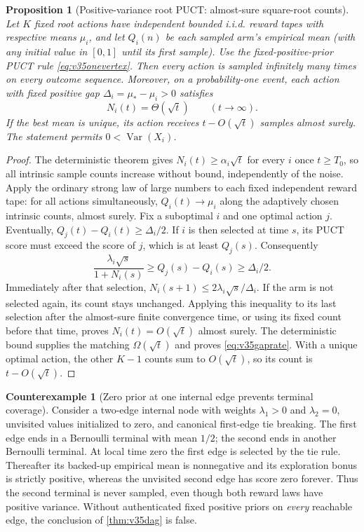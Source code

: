 \documentclass{article}
\theoremstyle{plain}
\newtheorem{proposition}[theorem]{Proposition}
\theoremstyle{definition}
\newtheorem{counterexample}[theorem]{Counterexample}
\begin{document}
\begin{proposition}[Positive-variance root PUCT: almost-sure square-root counts]
\label{prop:v35rootrates}
Let $K$ fixed root actions have independent bounded i.i.d. reward
tapes with respective means $\mu_i$, and let $Q_i(n)$ be each sampled
arm's empirical mean (with any initial value in $[0,1]$ until its
first sample). Use the fixed-positive-prior PUCT rule
\eqref{eq:v35onevertex}. Then every action is sampled infinitely
many times on every outcome sequence. Moreover, on a probability-one
event, each action with fixed positive gap
$\Delta_i=\mu_* -\mu_i>0$ satisfies
\begin{equation}
 \boxed{\qquad N_i(t)=\Theta(\sqrt t)\qquad(t\to\infty).\qquad}
 \label{eq:v35gaprate}
\end{equation}
If the best mean is unique, its action receives $t-O(\sqrt t)$
samples almost surely. The statement permits $0<\operatorname{Var}(X_i)$.
\end{proposition}
\begin{proof}
The deterministic theorem gives $N_i(t)\ge\alpha_i\sqrt t$
for every $i$ once $t\ge T_0$, so all intrinsic sample counts
increase without bound, independently of the noise. Apply the ordinary
strong law of large numbers to each fixed independent reward tape:
for all actions simultaneously, $Q_i(t)\to\mu_i$ along the
adaptively chosen intrinsic counts, almost surely.
Fix a suboptimal $i$ and one optimal action $j$. Eventually,
$Q_j(t)-Q_i(t)\ge\Delta_i/2$. If $i$ is then selected at time $s$,
its PUCT score must exceed the score of $j$, which is at least
$Q_j(s)$. Consequently
\[
 \frac{\lambda_i\sqrt s}{1+N_i(s)}
 \ge Q_j(s)-Q_i(s)\ge\Delta_i/2.
\]
Immediately after that selection,
$N_i(s+1)\le2\lambda_i\sqrt s/\Delta_i$. If the arm is not
selected again, its count stays unchanged. Applying this inequality
to its last selection after the almost-sure finite convergence time,
or using its fixed count before that time, proves
$N_i(t)=O(\sqrt t)$ almost surely. The deterministic bound supplies
the matching $\Omega(\sqrt t)$ and proves
\eqref{eq:v35gaprate}. With a unique optimal action, the other
$K-1$ counts sum to $O(\sqrt t)$, so its count is
$t-O(\sqrt t)$.
\end{proof}

\begin{counterexample}[Zero prior at one internal edge prevents terminal coverage]
\label{ce:v35prior}
Consider a two-edge internal node with weights $\lambda_1>0$ and
$\lambda_2=0$, unvisited values initialized to zero, and canonical
first-edge tie breaking. The first edge ends in a Bernoulli terminal
with mean $1/2$; the second ends in another Bernoulli terminal.
At local time zero the first edge is selected by the tie rule.
Thereafter its backed-up empirical mean is nonnegative and its
exploration bonus is strictly positive, whereas the unvisited
second edge has score zero forever. Thus the second terminal is never
sampled, even though both reward laws have positive variance.
Without authenticated fixed positive priors on \emph{every} reachable
edge, the conclusion of \cref{thm:v35dag} is false.
\end{counterexample}
\end{document}
